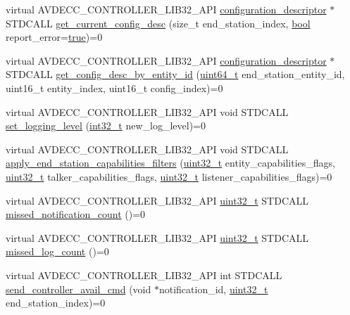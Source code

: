 \begin{DoxyCompactItemize}
virtual A\+V\+D\+E\+C\+C\+\_\+\+C\+O\+N\+T\+R\+O\+L\+L\+E\+R\+\_\+\+L\+I\+B32\+\_\+\+A\+PI \hyperlink{classavdecc__lib_1_1configuration__descriptor}{configuration\+\_\+descriptor} $\ast$S\+T\+D\+C\+A\+LL \hyperlink{classavdecc__lib_1_1controller_af249ed146464b54d7fc9d87f67bcff46}{get\+\_\+current\+\_\+config\+\_\+desc} (size\+\_\+t end\+\_\+station\+\_\+index, \hyperlink{avb__gptp_8h_af6a258d8f3ee5206d682d799316314b1}{bool} report\+\_\+error=\hyperlink{avb__gptp_8h_af6a258d8f3ee5206d682d799316314b1a08f175a5505a10b9ed657defeb050e4b}{true})=0
\item 
virtual A\+V\+D\+E\+C\+C\+\_\+\+C\+O\+N\+T\+R\+O\+L\+L\+E\+R\+\_\+\+L\+I\+B32\+\_\+\+A\+PI \hyperlink{classavdecc__lib_1_1configuration__descriptor}{configuration\+\_\+descriptor} $\ast$S\+T\+D\+C\+A\+LL \hyperlink{classavdecc__lib_1_1controller_a76d652b9a44cd22cf7b68faf4882fa38}{get\+\_\+config\+\_\+desc\+\_\+by\+\_\+entity\+\_\+id} (\hyperlink{parse_8c_aec6fcb673ff035718c238c8c9d544c47}{uint64\+\_\+t} end\+\_\+station\+\_\+entity\+\_\+id, uint16\+\_\+t entity\+\_\+index, uint16\+\_\+t config\+\_\+index)=0
\item 
virtual A\+V\+D\+E\+C\+C\+\_\+\+C\+O\+N\+T\+R\+O\+L\+L\+E\+R\+\_\+\+L\+I\+B32\+\_\+\+A\+PI void S\+T\+D\+C\+A\+LL \hyperlink{classavdecc__lib_1_1controller_ab7daf140b2dba386eb61dbd3f07e8b04}{set\+\_\+logging\+\_\+level} (\hyperlink{parse_8c_a37994e3b11c72957c6f454c6ec96d43d}{int32\+\_\+t} new\+\_\+log\+\_\+level)=0
\item 
virtual A\+V\+D\+E\+C\+C\+\_\+\+C\+O\+N\+T\+R\+O\+L\+L\+E\+R\+\_\+\+L\+I\+B32\+\_\+\+A\+PI void S\+T\+D\+C\+A\+LL \hyperlink{classavdecc__lib_1_1controller_a7c092a56b1926b3a5b8d9d73d3de1775}{apply\+\_\+end\+\_\+station\+\_\+capabilities\+\_\+filters} (\hyperlink{parse_8c_a6eb1e68cc391dd753bc8ce896dbb8315}{uint32\+\_\+t} entity\+\_\+capabilities\+\_\+flags, \hyperlink{parse_8c_a6eb1e68cc391dd753bc8ce896dbb8315}{uint32\+\_\+t} talker\+\_\+capabilities\+\_\+flags, \hyperlink{parse_8c_a6eb1e68cc391dd753bc8ce896dbb8315}{uint32\+\_\+t} listener\+\_\+capabilities\+\_\+flags)=0
\item 
virtual A\+V\+D\+E\+C\+C\+\_\+\+C\+O\+N\+T\+R\+O\+L\+L\+E\+R\+\_\+\+L\+I\+B32\+\_\+\+A\+PI \hyperlink{parse_8c_a6eb1e68cc391dd753bc8ce896dbb8315}{uint32\+\_\+t} S\+T\+D\+C\+A\+LL \hyperlink{classavdecc__lib_1_1controller_ac28ebd018776d6e443eadefae0e552f2}{missed\+\_\+notification\+\_\+count} ()=0
\item 
virtual A\+V\+D\+E\+C\+C\+\_\+\+C\+O\+N\+T\+R\+O\+L\+L\+E\+R\+\_\+\+L\+I\+B32\+\_\+\+A\+PI \hyperlink{parse_8c_a6eb1e68cc391dd753bc8ce896dbb8315}{uint32\+\_\+t} S\+T\+D\+C\+A\+LL \hyperlink{classavdecc__lib_1_1controller_acbdaec4f84286d9f06c81ebc0bce0c87}{missed\+\_\+log\+\_\+count} ()=0
\item 
virtual A\+V\+D\+E\+C\+C\+\_\+\+C\+O\+N\+T\+R\+O\+L\+L\+E\+R\+\_\+\+L\+I\+B32\+\_\+\+A\+PI int S\+T\+D\+C\+A\+LL \hyperlink{classavdecc__lib_1_1controller_ac9fcf9cd99796cb860ce8c34b3bde9d4}{send\+\_\+controller\+\_\+avail\+\_\+cmd} (void $\ast$notification\+\_\+id, \hyperlink{parse_8c_a6eb1e68cc391dd753bc8ce896dbb8315}{uint32\+\_\+t} end\+\_\+station\+\_\+index)=0
\end{DoxyCompactItemize}


